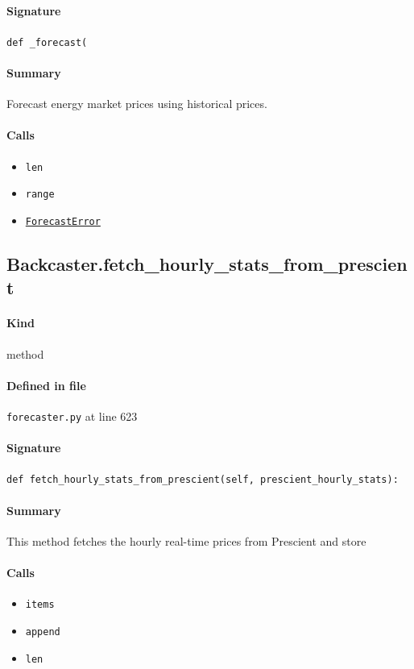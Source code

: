 \documentclass[11pt]{report}
\begin{document}
\paragraph{Signature} \texttt{def \_forecast(}
\paragraph{Summary} Forecast energy market prices using historical prices.
\paragraph{Calls}
\begin{itemize}[leftmargin=*]
  \item \texttt{len}
  \item \texttt{range}
  \item \hyperref[def:forecaster.py:ForecastError:L22]{\texttt{ForecastError}}
\end{itemize}
\subsection{Backcaster.fetch\_hourly\_stats\_from\_prescient}
\label{def:forecaster.py:Backcaster.fetch_hourly_stats_from_prescient:L623}
\paragraph{Kind} method
\paragraph{Defined in file} \texttt{forecaster.py} at line 623
\paragraph{Signature} \texttt{def fetch\_hourly\_stats\_from\_prescient(self, prescient\_hourly\_stats):}
\paragraph{Summary} This method fetches the hourly real-time prices from Prescient and store
\paragraph{Calls}
\begin{itemize}[leftmargin=*]
  \item \texttt{items}
  \item \texttt{append}
  \item \texttt{len}
\end{itemize}
\end{document}
